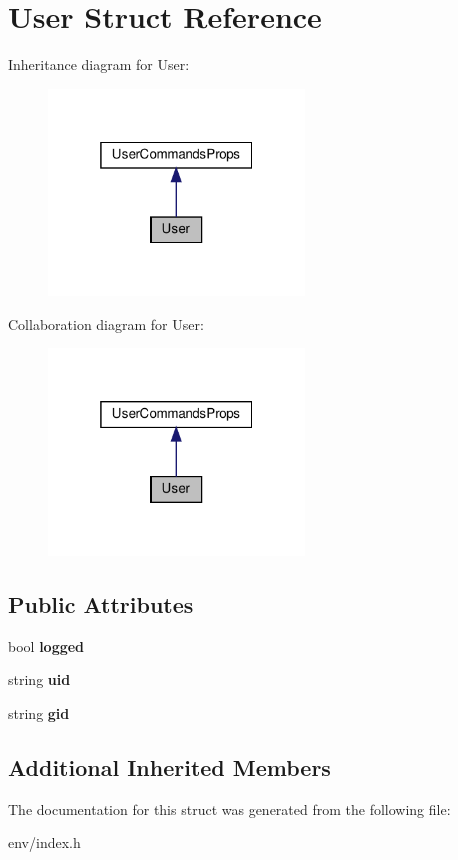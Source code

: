 \hypertarget{structUser}{}\section{User Struct Reference}
\label{structUser}


Inheritance diagram for User\+:\nopagebreak
\begin{figure}[H]
\begin{center}
\leavevmode
\includegraphics[width=193pt]{structUser__inherit__graph}
\end{center}
\end{figure}


Collaboration diagram for User\+:\nopagebreak
\begin{figure}[H]
\begin{center}
\leavevmode
\includegraphics[width=193pt]{structUser__coll__graph}
\end{center}
\end{figure}
\subsection*{Public Attributes}
\begin{DoxyCompactItemize}
\item 
\mbox{\label{structUser_a2f03286ef5f028e69401a8a31fc17670}} 
bool {\bfseries logged}
\item 
\mbox{\label{structUser_a49574651dbb03bde828ef9fb0cea17ed}} 
string {\bfseries uid}
\item 
\mbox{\label{structUser_ac7f46b6a7edfa8f3044f6d50d1ec6647}} 
string {\bfseries gid}
\end{DoxyCompactItemize}
\subsection*{Additional Inherited Members}


The documentation for this struct was generated from the following file\+:\begin{DoxyCompactItemize}
\item 
env/index.\+h\end{DoxyCompactItemize}
